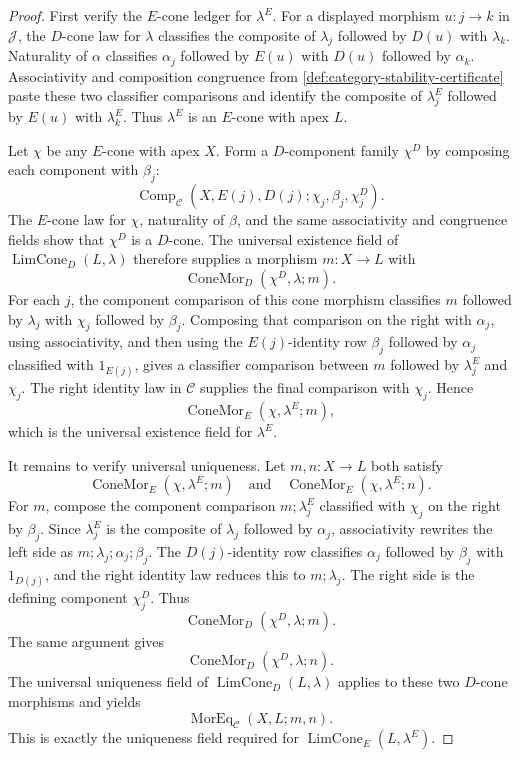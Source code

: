 \begin{proof}
First verify the $E$-cone ledger for $\lambda^E$. For a displayed morphism $u:j\to k$ in $\mathcal J$, the $D$-cone law for $\lambda$ classifies the composite of $\lambda_j$ followed by $D(u)$ with $\lambda_k$. Naturality of $\alpha$ classifies $\alpha_j$ followed by $E(u)$ with $D(u)$ followed by $\alpha_k$. Associativity and composition congruence from \autoref{def:category-stability-certificate} paste these two classifier comparisons and identify the composite of $\lambda^E_j$ followed by $E(u)$ with $\lambda^E_k$. Thus $\lambda^E$ is an $E$-cone with apex $L$.

Let $\chi$ be any $E$-cone with apex $X$. Form a $D$-component family $\chi^D$ by composing each component with $\beta_j$:
$$
\operatorname{Comp}_{\mathcal C}(X,E(j),D(j);\chi_j,\beta_j,\chi^D_j).
$$
The $E$-cone law for $\chi$, naturality of $\beta$, and the same associativity and congruence fields show that $\chi^D$ is a $D$-cone. The universal existence field of $\operatorname{LimCone}_{D}(L,\lambda)$ therefore supplies a morphism $m:X\to L$ with
$$
\operatorname{ConeMor}_{D}(\chi^D,\lambda;m).
$$
For each $j$, the component comparison of this cone morphism classifies $m$ followed by $\lambda_j$ with $\chi_j$ followed by $\beta_j$. Composing that comparison on the right with $\alpha_j$, using associativity, and then using the $E(j)$-identity row $\beta_j$ followed by $\alpha_j$ classified with $1_{E(j)}$, gives a classifier comparison between $m$ followed by $\lambda^E_j$ and $\chi_j$. The right identity law in $\mathcal C$ supplies the final comparison with $\chi_j$. Hence
$$
\operatorname{ConeMor}_{E}(\chi,\lambda^E;m),
$$
which is the universal existence field for $\lambda^E$.

It remains to verify universal uniqueness. Let $m,n:X\to L$ both satisfy
$$
\operatorname{ConeMor}_{E}(\chi,\lambda^E;m)
\quad\text{and}\quad
\operatorname{ConeMor}_{E}(\chi,\lambda^E;n).
$$
For $m$, compose the component comparison $m;\lambda^E_j$ classified with $\chi_j$ on the right by $\beta_j$. Since $\lambda^E_j$ is the composite of $\lambda_j$ followed by $\alpha_j$, associativity rewrites the left side as $m;\lambda_j;\alpha_j;\beta_j$. The $D(j)$-identity row classifies $\alpha_j$ followed by $\beta_j$ with $1_{D(j)}$, and the right identity law reduces this to $m;\lambda_j$. The right side is the defining component $\chi^D_j$. Thus
$$
\operatorname{ConeMor}_{D}(\chi^D,\lambda;m).
$$
The same argument gives
$$
\operatorname{ConeMor}_{D}(\chi^D,\lambda;n).
$$
The universal uniqueness field of $\operatorname{LimCone}_{D}(L,\lambda)$ applies to these two $D$-cone morphisms and yields
$$
\operatorname{MorEq}_{\mathcal C}(X,L;m,n).
$$
This is exactly the uniqueness field required for $\operatorname{LimCone}_{E}(L,\lambda^E)$.
\end{proof}

